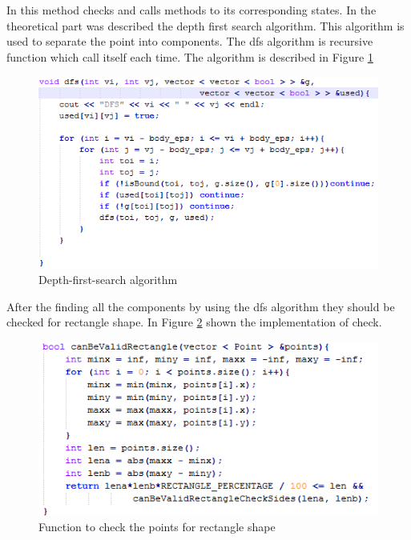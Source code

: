 In this method checks and calls methods to its corresponding states. In the theoretical part was described the depth first search algorithm. This algorithm is used to separate the point into components. The dfs algorithm is recursive function which call itself each time. The algorithm is described in Figure \ref{fig:dfs_algo}

\begin{figure}[h]
    \centering
    \includegraphics[width=\textwidth]{Figures/dfs_algo}
    \caption{Depth-first-search algorithm}
    \label{fig:dfs_algo}
\end{figure}

After the finding all the components by using the dfs algorithm they should be checked for rectangle shape. In Figure \ref{fig:check_rect} shown the implementation of check.

\begin{figure}[h]
    \centering
    \includegraphics[]{Figures/check_rect}
    \caption{Function to check the points for rectangle shape}
    \label{fig:check_rect}
\end{figure}


